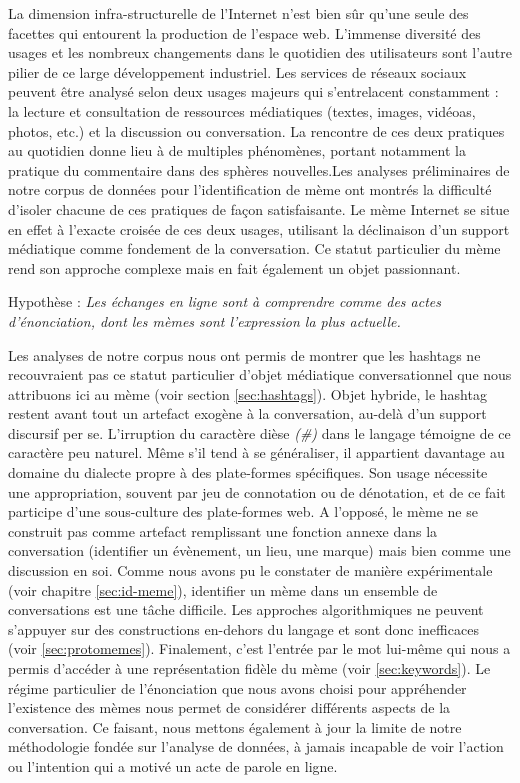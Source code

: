 La dimension infra-structurelle de l'Internet n'est bien sûr qu'une seule des facettes qui entourent la production de l'espace web. L'immense diversité des usages et les nombreux changements dans le quotidien des utilisateurs sont l'autre pilier de ce large développement industriel. Les services de réseaux sociaux peuvent être analysé selon deux usages majeurs qui s'entrelacent constamment : la lecture et consultation de ressources médiatiques (textes, images, vidéoas, photos, etc.) et la discussion ou conversation. La rencontre de ces deux pratiques au quotidien donne lieu à de multiples phénomènes, portant notamment la pratique du commentaire dans des sphères nouvelles.Les analyses préliminaires de notre corpus de données pour l'identification de mème ont montrés la difficulté d'isoler chacune de ces pratiques de façon satisfaisante. Le mème Internet se situe en effet à l'exacte croisée de ces deux usages, utilisant la déclinaison d'un support médiatique comme fondement de la conversation. Ce statut particulier du mème rend son approche complexe mais en fait également un objet passionnant. 

Hypothèse : \textit{Les échanges en ligne sont à comprendre comme des actes d'énonciation, dont les mèmes sont l'expression la plus actuelle.}

Les analyses de notre corpus nous ont permis de montrer que les hashtags ne recouvraient pas ce statut particulier d'objet médiatique conversationnel que nous attribuons ici au mème (voir section \ref{sec:hashtags}). Objet hybride, le hashtag restent avant tout un artefact exogène à la conversation, au-delà d'un support discursif per se. L'irruption du caractère dièse \textit{(#)} dans le langage témoigne de ce caractère peu naturel. Même s'il tend à se généraliser, il appartient davantage au domaine du dialecte propre à des plate-formes spécifiques. Son usage nécessite une appropriation, souvent par jeu de connotation ou de dénotation, et de ce fait participe d'une sous-culture des plate-formes web. A l'opposé, le mème ne se construit pas comme artefact remplissant une fonction annexe dans la conversation (identifier un évènement, un lieu, une marque) mais bien comme une discussion en soi. Comme nous avons pu le constater de manière expérimentale (voir chapitre \ref{sec:id-meme}), identifier un mème dans un ensemble de conversations est une tâche difficile. Les approches algorithmiques ne peuvent s'appuyer sur des constructions en-dehors du langage et sont donc inefficaces (voir \ref{sec:protomemes}). Finalement, c'est l'entrée par le mot lui-même qui nous a permis d'accéder à une représentation fidèle du mème (voir \ref{sec:keywords}). Le régime particulier de l'énonciation que nous avons choisi pour appréhender l'existence des mèmes nous permet de considérer différents aspects de la conversation. Ce faisant, nous mettons également à jour la limite de notre méthodologie fondée sur l'analyse de données, à jamais incapable de voir l'action ou l'intention qui a motivé un acte de parole en ligne. 

